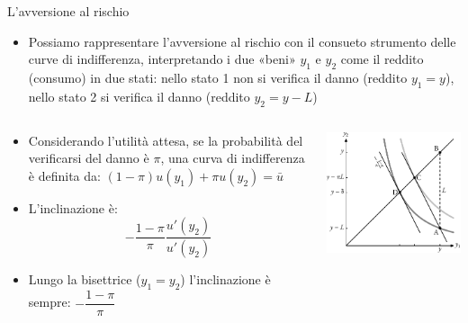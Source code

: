 \documentclass[aspectratio=64,12pt]{beamer}
\begin{document}
\begin{frame}{L'avversione al rischio}
\begin{itemize}
\item Possiamo rappresentare l'avversione al rischio con il consueto strumento
delle curve di indifferenza, interpretando i due «beni» $y_1$ e $y_2$ come
il reddito (consumo) in due stati: nello stato 1 non si verifica il danno
(reddito $y_1=y$), nello stato 2 si verifica il danno (reddito $y_2=y-L$)
\end{itemize}
\begin{columns}
\begin{column}{.5\columnwidth}
\begin{itemize}
\item Considerando l'utilità attesa, se la probabilità del verificarsi del
danno è $\pi$, una curva di indifferenza è definita da: $(1-\pi)u(y_1)+\pi
  u(y_2)=\bar u$
\item L'inclinazione è:
$$ -\frac{1-\pi}{\pi}\frac{u'(y_2)}{u'(y_2)} $$
\item Lungo la
bisettrice ($y_1=y_2$) l'inclinazione è sempre: $ -\dfrac{1-\pi}{\pi} $
\end{itemize}
\end{column}
\begin{column}{.5\columnwidth}
\begin{center}
\includegraphics[width=.9\textwidth]{./figure/rischio-1.pdf}
\end{center}
\end{column}
\end{columns}
\end{frame}
\end{document}
